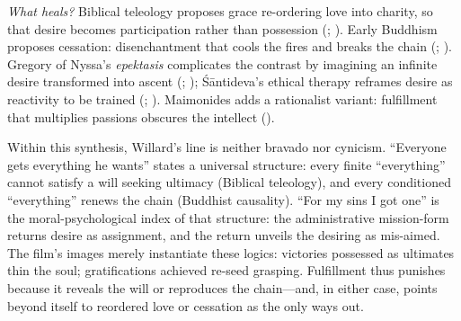 \documentclass[12pt]{article}
\begin{document}
\emph{What heals?} Biblical teleology proposes grace re-ordering love into charity, so that desire becomes participation rather than possession (\parencite{AugustineCity2003}; \parencite{AquinasST1947}). Early Buddhism proposes cessation: disenchantment that cools the fires and breaks the chain (\parencite{BodhiSN2000}; \parencite{Rahula1959}). Gregory of Nyssa’s \emph{epektasis} complicates the contrast by imagining an infinite desire transformed into ascent (\parencite{GregoryMoses1978}; \parencite{GregoryBeatitudes1954}); Śāntideva’s ethical therapy reframes desire as reactivity to be trained (\parencite{SantidevaBCA1995}; \parencite{Gethin1998}). Maimonides adds a rationalist variant: fulfillment that multiplies passions obscures the intellect (\parencite{MaimonidesGuide1963}).

Within this synthesis, Willard’s line is neither bravado nor cynicism. ``Everyone gets everything he wants'' states a universal structure: every finite ``everything'' cannot satisfy a will seeking ultimacy (Biblical teleology), and every conditioned ``everything'' renews the chain (Buddhist causality). ``For my sins I got one'' is the moral-psychological index of that structure: the administrative mission-form returns desire as assignment, and the return unveils the desiring as mis-aimed. The film’s images merely instantiate these logics: victories possessed as ultimates thin the soul; gratifications achieved re-seed grasping. Fulfillment thus punishes because it reveals the will or reproduces the chain---and, in either case, points beyond itself to reordered love or cessation as the only ways out.

\printbibliography
\end{document}
